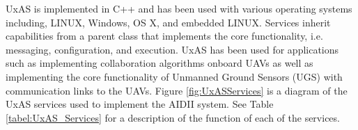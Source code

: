 UxAS is implemented in C++ and has been used with various operating systems including, LINUX, Windows, OS X, and embedded LINUX. Services inherit capabilities from a parent class that implements the core functionality, i.e. messaging, configuration, and execution. UxAS has been used for applications such as implementing collaboration algorithms onboard UAVs as well as implementing the core functionality of Unmanned Ground Sensors (UGS) with communication links to the UAVs. Figure \ref{fig:UxASServices} is a diagram of the UxAS services used to implement the AIDII system. See Table \ref{tabel:UxAS_Services} for a description of the function of each of the services.

